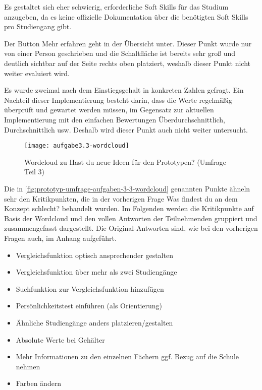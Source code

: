 Es gestaltet sich eher schwierig, erforderliche Soft Skills für das Studium anzugeben, da es keine offizielle Dokumentation über die benötigten Soft Skills pro Studiengang gibt.

Der Button \glqq Mehr erfahren\grqq{} geht in der Übersicht unter. Dieser Punkt wurde nur von einer Person geschrieben und die Schaltfläche ist bereits sehr groß und deutlich sichtbar auf der Seite rechts oben platziert, weshalb dieser Punkt nicht weiter evaluiert wird.

Es wurde zweimal nach dem Einstiegsgehalt in konkreten Zahlen gefragt. Ein Nachteil dieser Implementierung besteht darin, dass die Werte regelmäßig überprüft und gewartet werden müssen, im Gegensatz zur aktuellen Implementierung mit den einfachen Bewertungen \glqq Überdurchschnittlich\grqq{}, \glqq Durchschnittlich\grqq{} usw. Deshalb wird dieser Punkt auch nicht weiter untersucht.

\begin{figure}[H]
    \centering
    \texttt{[image: aufgabe3.3-wordcloud]}
    \caption{Wordcloud zu \glqq Hast du neue Ideen für den Prototypen?\grqq{} (Umfrage Teil 3)}
    \label{fig:prototyp-umfrage-aufgaben-3-3-wordcloud}
\end{figure}

Die in \autoref{fig:prototyp-umfrage-aufgaben-3-3-wordcloud} genannten Punkte ähneln sehr den Kritikpunkten, die in der vorherigen Frage \glqq Was findest du an dem Konzept schlecht?\grqq{} behandelt wurden. Im Folgenden werden die Kritikpunkte auf Basis der Wordcloud und den vollen Antworten der Teilnehmenden gruppiert und zusammengefasst dargestellt. Die Original-Antworten sind, wie bei den vorherigen Fragen auch, im Anhang aufgeführt.


\begin{itemize}
    \item Vergleichsfunktion optisch ansprechender gestalten
    \item Vergleichsfunktion über mehr als zwei Studiengänge
    \item Suchfunktion zur Vergleichsfunktion hinzufügen
    \item Persönlichkeitstest einführen (als Orientierung)
    \item Ähnliche Studiengänge anders platzieren/gestalten
    \item Absolute Werte bei Gehälter
    \item Mehr Informationen zu den einzelnen Fächern ggf. Bezug auf die Schule
    nehmen
    \item Farben ändern
\end{itemize}

